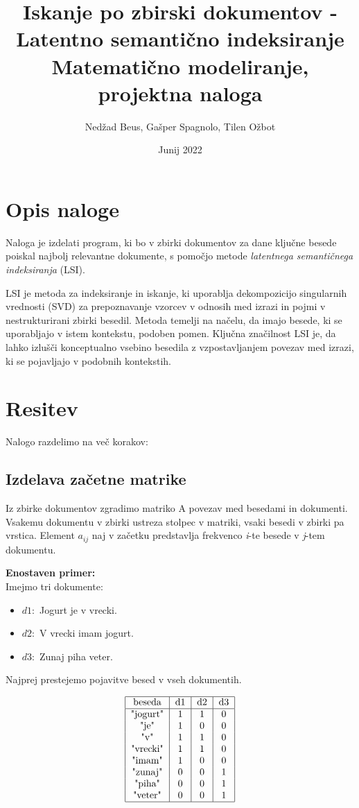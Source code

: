 \documentclass{article}
\title{Iskanje po zbirski dokumentov -
        Latentno semantično indeksiranje \\
        \large Matematično modeliranje, projektna naloga}
\author{Nedžad Beus, Gašper Spagnolo, Tilen Ožbot}
\date{Junij 2022}
\begin{document}
\maketitle
\pagebreak

\section{Opis naloge}
\par Naloga je izdelati program, ki bo v zbirki dokumentov za dane ključne besede poiskal najbolj relevantne dokumente, s pomočjo metode \textit{latentnega semantičnega indeksiranja} (LSI). 
\par LSI je metoda za indeksiranje in iskanje, ki uporablja dekompozicijo singularnih vrednosti (SVD) za prepoznavanje vzorcev v odnosih med izrazi in pojmi v nestrukturirani zbirki besedil. Metoda temelji na načelu, da imajo besede, ki se uporabljajo v istem kontekstu, podoben pomen. Ključna značilnost LSI je, da lahko izlušči konceptualno vsebino besedila z vzpostavljanjem povezav med izrazi, ki se pojavljajo v podobnih kontekstih.

\section{Resitev}
Nalogo razdelimo na več korakov:

\subsection{Izdelava začetne matrike}
Iz zbirke dokumentov zgradimo matriko A povezav med besedami in dokumenti. Vsakemu dokumentu v zbirki ustreza stolpec v matriki, vsaki besedi v zbirki pa vrstica. Element $a_{ij}$ naj v začetku predstavlja frekvenco \textit{i}-te besede v \textit{j}-tem dokumentu.

\textbf{Enostaven primer:}\\
Imejmo tri dokumente:

\begin{itemize}
    \item $d1:$ Jogurt je v vrecki.
    \item $d2:$ V vrecki imam jogurt.
    \item $d3:$ Zunaj piha veter.
\end{itemize}

Najprej prestejemo pojavitve besed v vseh dokumentih.

\[
\begin{tabular}{ |c|c|c|c| } 
    \hline
    beseda    & d1 &  d2  & d3\\
    \hline
    "jogurt"    & 1 & 1 & 0 \\ 
    "je"        & 1 & 0 & 0 \\ 
    "v"         & 1 & 1 & 0 \\ 
    "vrecki"    & 1 & 1 & 0 \\ 
    "imam"      & 1 & 0 & 0 \\ 
    "zunaj"     & 0 & 0 & 1 \\ 
    "piha"      & 0 & 0 & 1 \\ 
    "veter"     & 0 & 0 & 1 \\ 
    \hline
\end{tabular}
\]
\end{document}
